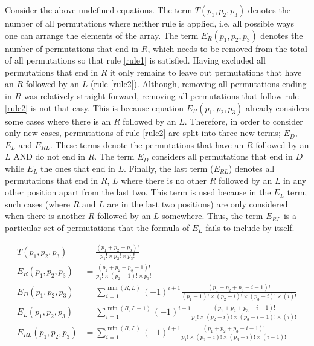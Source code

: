 Consider the above undefined equations. 
The term \(T(p_1,p_2,p_3)\) denotes the number of all permutations where neither rule is applied, i.e. all possible ways one can arrange the elements of the array.
The term \(E_R(p_1,p_2,p_3)\) denotes the number of permutations that end in \(R\), which needs to be removed from the total of all permutations so that rule \ref{rule1} is satisfied.
Having excluded all permutations that end in \(R\) it only remains to leave out permutations that have an \(R\) followed by an \(L\) (rule \ref{rule2}).
Although, removing all permutations ending in \(R\) was relatively straight forward, removing all permutations that follow rule \ref{rule2} is not that easy.
This is because equation \(E_R(p_1,p_2,p_3)\) already considers some cases where there is an \(R\) followed by an \(L\).
Therefore, in order to consider only new cases, permutations of rule \ref{rule2} are split into three new terms; \(E_D\), \(E_L\) and \(E_{RL}\).
These terms denote the permutations that have an \(R\) followed by an \(L\) AND do not end in \(R\).
The term \(E_D\) considers all permutations that end in \(D\) while \(E_L\) the ones that end in \(L\).
Finally, the last term (\(E_{RL}\)) denotes all permutations that end in \(R\), \(L\) where there is no other \(R\) followed by an \(L\) in any other position apart from the last two. 
This term is used because in the \(E_L\) term, such cases (where \(R\) and \(L\) are in the last two positions) are only considered when there is another \(R\) followed by an \(L\) somewhere.
Thus, the term \(E_{RL}\) is a particular set of permutations that the formula of \(E_L\) fails to include by itself.

\begin{align}
    T(p_1, p_2, p_3) &= \frac{(p_1 + p_2 + p_3)!}{p_1! \times p_2! \times p_3!} \\
    E_R(p_1, p_2, p_3) &= \frac{(p_1 + p_2 + p_3 - 1)!}{p_1! \times (p_2-1)! \times p_3!} \\
    E_D(p_1, p_2, p_3) &= \sum_{i=1}^{\min(R,L)} (-1)^{i+1} \frac{(p_1 + p_2 + p_3 - i - 1)!}{(p_1 - 1)! \times (p_2 - i)! \times (p_3 - i)! \times (i)!} \\
    E_L(p_1, p_2, p_3) &= \sum_{i=1}^{\min(R,L-1)} (-1)^{i+1} \frac{(p_1 + p_2 + p_3 - i - 1)!}{p_1! \times (p_2 - i)! \times (p_3 - i - 1)! \times (i)!} \\
    E_{RL}(p_1, p_2, p_3) &= \sum_{i=1}^{\min(R,L)} (-1)^{i+1} \frac{(p_1 + p_2 + p_3 - i - 1)!}{p_1! \times (p_2 - i)! \times (p_3 - i)! \times (i - 1)!} 
\end{align}

